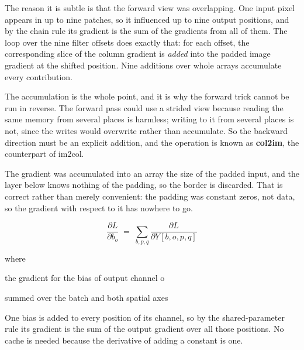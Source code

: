 The reason it is subtle is that the forward view was overlapping. One input pixel appears in up to nine patches, so it influenced up to nine output positions, and by the chain rule its gradient is the sum of the gradients from all of them. The loop over the nine filter offsets does exactly that: for each offset, the corresponding slice of the column gradient is \emph{added} into the padded image gradient at the shifted position. Nine additions over whole arrays accumulate every contribution.

The accumulation is the whole point, and it is why the forward trick cannot be run in reverse. The forward pass could use a strided view because reading the same memory from several places is harmless; writing to it from several places is not, since the writes would overwrite rather than accumulate. So the backward direction must be an explicit addition, and the operation is known as \textbf{col2im}, the counterpart of im2col.


The gradient was accumulated into an array the size of the padded input, and the layer below knows nothing of the padding, so the border is discarded. That is correct rather than merely convenient: the padding was constant zeros, not data, so the gradient with respect to it has nowhere to go.



\begin{equation}
\frac{\partial L}{\partial b_o} \;=\; \sum_{b,p,q} \frac{\partial L}{\partial Y[b,o,p,q]}
\end{equation}

\noindent where
\begin{description}[leftmargin=2.4em,style=nextline,font=\normalfont\ttfamily]\setlength\itemsep{1pt}
  \item[{$\frac{\partial L}{\partial b_o}$}] \normalfont the gradient for the bias of output channel o
  \item[{$\sum_{b,p,q}$}] \normalfont summed over the batch and both spatial axes
\end{description}
One bias is added to every position of its channel, so by the shared-parameter rule its gradient is the sum of the output gradient over all those positions. No cache is needed because the derivative of adding a constant is one.



